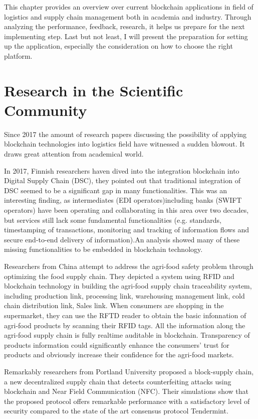 This chapter provides an overview over current blockchain applications in field of logistics and supply chain management both in academia and industry. Through analyzing the performance, feedback, research, it helps us prepare for the next implementing step. Last but not least, I will present the preparation for setting up the application, especially the consideration on how to choose the right platform.

\section{Research in the Scientific Community}
Since 2017 the amount of research papers discussing the possibility of applying blockchain technologies into logistics field have witnessed a sudden blowout. It draws great attention from academical world. 

In 2017, Finnish researchers haven dived into the integration blockchain into Digital Supply Chain (DSC), they pointed out that traditional integration of DSC seemed to be a significant gap in many functionalities. This was an interesting finding, as intermediates (EDI operators)including banks (SWIFT operators) have been operating and collaborating in this area over two
decades, but services still lack some fundamental
functionalities (e.g. standards, timestamping of
transactions, monitoring and tracking of information
flows and secure end-to-end delivery of information).An analysis showed many of these missing
functionalities to be embedded in blockchain technology.\cite{chapter4-dsc}

Researchers from China attempt to address the agri-food safety problem through optimizing the food supply chain. They depicted a system using RFID and blockchain technology in building the agri-food supply chain traceability system, including production link, processing link, warehousing management link, cold chain distribution link, Sales link. When consumers are shopping in the supermarket, they can use the
RFTD reader to obtain the basic infonnation of agri-food
products by scanning their RFID tags. All the information along the agri-food supply chain is fully realtime auditable in blockchain.
Transparency of products information could significantly
enhance the consumers' trust for products and obviously
increase their confidence for the agri-food markets.\cite{chapter4-RFID}

Remarkably researchers from Portland University proposed a block-supply
chain, a new decentralized supply chain that detects counterfeiting
attacks using blockchain and Near Field Communication (NFC). Their simulations show that the proposed protocol offers remarkable performance with a satisfactory level of security compared to the state of the art consensus protocol Tendermint.\cite{chapter4-nfc}

